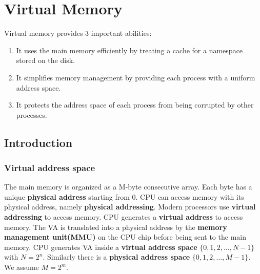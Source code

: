 \ifx\PREAMBLE\undefined


\fi
\newpage
\section{Virtual Memory}
Virtual memory provides 3 important abilities:
\begin{enumerate}
	\item It uses the main memory efficiently by treating a cache for a namespace stored on the disk.
	\item It simplifies memory management by providing each process with a uniform address space.
	\item It protects the address space of each process from being corrupted by other processes.
\end{enumerate}
\subsection{Introduction}
\subsubsection{Virtual address space}
The main memory is organized as a M-byte consecutive array. Each byte has a unique \textbf{physical address} starting from 0. CPU can access memory with its physical address, namely \textbf{physical addressing}. Modern processors use \textbf{virtual addressing} to access memory. CPU generates a \textbf{virtual address} to access memory. The VA is translated into a physical address by the \textbf{memory management unit(MMU)} on the CPU chip before being sent to the main memory. CPU generates VA inside a \textbf{virtual address space} $\{0, 1, 2, \dots, N-1\}$ with $N=2^n$. Similarly there is a \textbf{physical address space} $\{0,1,2,\dots,M-1\}$. We assume $M=2^m$.
